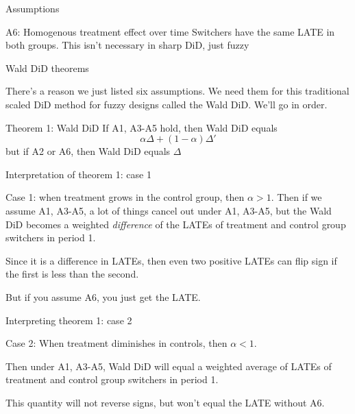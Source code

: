 \documentclass{beamer}
\begin{document}
\begin{frame}{Assumptions}

\begin{block}{A6: Homogenous treatment effect over time}
Switchers have the same LATE in both groups.  This isn't necessary in sharp DiD, just fuzzy
\end{block}

\end{frame}


\begin{frame}{Wald DiD theorems}

There's a reason we just listed six assumptions.  We need them for this traditional scaled DiD method for fuzzy designs called the Wald DiD.  We'll go in order. 

\begin{block}{Theorem 1: Wald DiD}
If A1, A3-A5 hold, then Wald DiD equals $$\alpha \Delta + (1-\alpha) \Delta '$$but if A2 or A6, then Wald DiD equals $\Delta$
\end{block}


\end{frame}


\begin{frame}{Interpretation of theorem 1: case 1}

Case 1: when treatment grows in the control group, then $\alpha>1$.  Then if we assume A1, A3-A5, a lot of things cancel out under A1, A3-A5, but the Wald DiD becomes a weighted \emph{difference} of the LATEs of treatment and control group switchers in period 1. \\

\bigskip

Since it is a difference in LATEs, then even two positive LATEs can flip sign if the first is less than the second. \\

\bigskip 

But if you assume A6, you just get the LATE.  

\end{frame}

\begin{frame}{Interpreting theorem 1: case 2}

Case 2: When treatment diminishes in controls, then $\alpha<1$. \\

\bigskip

Then under A1, A3-A5, Wald DiD will equal a weighted average of LATEs of treatment and control group switchers in period 1. \\

\bigskip

This quantity will not reverse signs, but won't equal the LATE without A6.

\end{frame}
\end{document}
